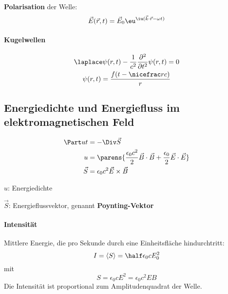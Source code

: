 			\textbf{Polarisation} der Welle:
			\begin{equation*}
				\vec E(\vec r, t) = \vec E_0 \eu^{\iu (\vec k \cdot \vec r - \omega t)}
			\end{equation*}
		
		\paragraph{Kugelwellen} %
			\begin{gather*}
				\laplace \psi (r,t) - \frac{1}{c^2} \frac{\partial^2}{\partial t^2} \psi(r,t) = 0 \\
				\psi(r,t) = \frac{f(t-\nicefrac r c)}{r}
			\end{gather*}
	\subsection{Energiedichte und Energiefluss im elektromagnetischen Feld} %
		\begin{align*}
			\Part u t &= -\Div \vec S \\
			u &= \parens{
				\frac{\epsilon_0 c^2}{2} \vec B \cdot \vec B + \frac{\epsilon_0}{2} \vec E \cdot \vec E
			} \\
			\vec S &= \epsilon_0 c^2 \vec E \times \vec B
		\end{align*}
		\begin{tightitemize}
			\item[$u$:] Energiedichte
			\item[$\vec S$:] Energieflussvektor, genannt \textbf{Poynting-Vektor}
		\end{tightitemize}
		
		\paragraph{Intensität} %
			Mittlere Energie, die pro Sekunde durch eine Einheitsfläche hindurchtritt:
			\begin{equation*}
				I = \left<S\right> = \half \epsilon_0 c E_0^2
			\end{equation*}
			mit
			\begin{equation*}
				S = \epsilon_0 c E^2 = \epsilon_0 c^2 E B
			\end{equation*}
			Die Intensität ist proportional zum Amplitudenquadrat der Welle.
